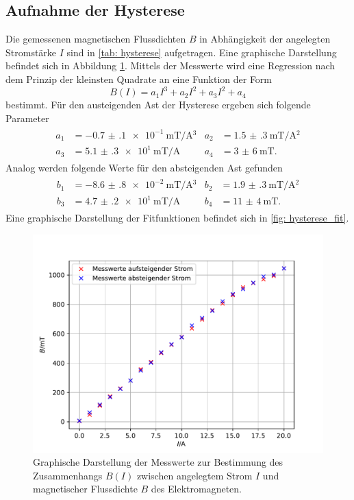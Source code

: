 \subsection{Aufnahme der Hysterese}
Die gemessenen magnetischen Flussdichten $B$ in Abhängigkeit der angelegten Stromstärke $I$
sind in \autoref{tab: hysterese} aufgetragen. Eine graphische Darstellung befindet sich in Abbildung
\ref{fig: hysterese_gesamt}. Mittels der Messwerte wird eine Regression nach dem Prinzip der kleinsten Quadrate
an eine Funktion der Form
\begin{equation}
  B(I) = a_1 I^3 + a_2 I^2 + a_3 I ^2 + a_4
  \label{eq: fitfuntion_hysterese}
\end{equation}
bestimmt. Für den austeigenden Ast der Hysterese ergeben sich folgende Parameter
\begin{align}
  \begin{aligned}
    a_1 &= \SI{-0.7(1)e-1}{\milli\tesla \per \ampere ^3} & a_2 &= \SI{1.5(3)}{\milli\tesla \per \ampere ^2} \\
    a_3 &= \SI{5.1(3)e1}{\milli\tesla \per \ampere } & a_4 &= \SI{3(6)}{\milli\tesla }.
    \label{eq: params_up}
  \end{aligned}
\end{align}
Analog werden folgende Werte für den absteigenden Ast gefunden
\begin{align}
  \begin{aligned}
    b_1 &= \SI{-8.6(8)e-2}{\milli\tesla \per \ampere ^3} & b_2 &= \SI{1.9(3)}{\milli\tesla \per \ampere ^2} \\
    b_3 &= \SI{4.7(2)e1}{\milli\tesla \per \ampere } & b_4 &= \SI{11(4)}{\milli\tesla }.
  \end{aligned}
\end{align}
Eine graphische Darstellung der Fitfunktionen befindet sich in \autoref{fig: hysterese_fit}.

\begin{figure}
  \centering
  \includegraphics[width = \textwidth]{../Messdaten/plots/hysterese_data.pdf}
  \caption{Graphische Darstellung der Messwerte zur Bestimmung des Zusammenhangs $B(I)$ zwischen angelegtem Strom $I$ und
  magnetischer Flussdichte $B$ des Elektromagneten.}
  \label{fig: hysterese_gesamt}
\end{figure}
